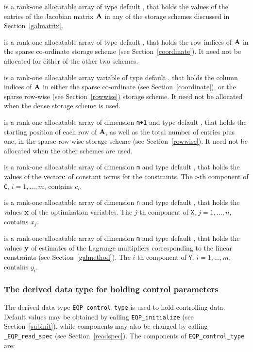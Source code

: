 \documentclass{galahad}
\newcommand{\packagename}{EQP}
\newcommand{\fullpackagename}{\libraryname\_\packagename}
\begin{document}
\begin{description}
\begin{description}
 is a rank-one allocatable array of type default \realdp, that holds
the values of the entries of the Jacobian matrix ${\mathbf{A}}$ in any of the 
storage schemes discussed in Section~\ref{galmatrix}.

 is a rank-one allocatable array of type default \integer,
that holds the row indices of ${\mathbf{A}}$ in the sparse co-ordinate storage
scheme (see Section~\ref{coordinate}). 
It need not be allocated for either of the other two schemes.

 is a rank-one allocatable array variable of type default \integer,
that holds the column indices of ${\mathbf{A}}$ in either the sparse co-ordinate 
(see Section~\ref{coordinate}), or the sparse row-wise 
(see Section~\ref{rowwise}) storage scheme.
It need not be allocated when the dense storage scheme is used.

 is a rank-one allocatable array of dimension {\tt m+1} and type 
default \integer, that holds the 
starting position of each row of ${\mathbf{A}}$, as well
as the total number of entries plus one, in the sparse row-wise storage
scheme (see Section~\ref{rowwise}). It need not be allocated when the
other schemes are used.

\end{description}

 is a rank-one allocatable array of dimension {\tt m} and type default 
\realdp, that holds the values of the vector${\mathbf{c}}$ of constant terms
for the constraints.
The $i$-th component of {\tt C}, $i = 1,  \ldots ,  m$, contains 
$c_{i}$.  

 is a rank-one allocatable array of dimension {\tt n} and type 
default \realdp, 
that holds the values ${\mathbf{x}}$ of the optimization variables.
The $j$-th component of {\tt X}, $j = 1,  \ldots , n$, contains $x_{j}$.  

 is a rank-one allocatable array of dimension {\tt m} and type 
default \realdp, that holds
the values ${\mathbf{y}}$ of estimates  of the Lagrange multipliers
corresponding to the linear constraints (see Section~\ref{galmethod}).
The $i$-th component of {\tt Y}, $i = 1,  \ldots ,  m$, contains $y_{i}$.  

\end{description}


\subsubsection{The derived data type for holding control 
 parameters}\label{typecontrol}
The derived data type 
{\tt \packagename\_control\_type} 
is used to hold controlling data. Default values may be obtained by calling 
{\tt \packagename\_initialize}
(see Section~\ref{subinit}),
while components may also be changed by calling 
{\tt \fullpackagename\_read\-\_spec}
(see Section~\ref{readspec}). 
The components of 
{\tt \packagename\_control\_type} 
are:
\end{document}
